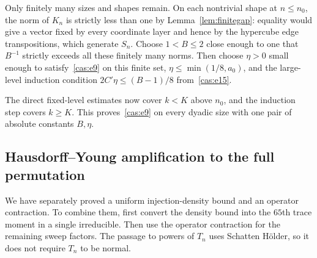 Only finitely many sizes and shapes remain. On each nontrivial shape
at $n\le n_0$, the norm of $K_n$ is strictly less than one by
Lemma~\ref{lem:finitegap}: equality would give a vector fixed by
every coordinate layer and hence by the hypercube edge transpositions,
which generate $S_n$. Choose $1<B\le2$ close enough to one that
$B^{-1}$ strictly exceeds all these finitely many norms. Then choose
$\eta>0$ small enough to satisfy~\eqref{cas:e9} on this finite set,
$\eta\le\min(1/8,a_0)$, and the large-level induction condition
$2C'\eta\le(B-1)/8$ from~\eqref{cas:e15}.

The direct fixed-level estimates now cover $k<K$ above $n_0$, and the
induction step covers $k\ge K$. This proves~\eqref{cas:e9} on every
dyadic size with one pair of absolute constants $B,\eta$.

\subsection{Hausdorff--Young amplification to the full permutation}

We have separately proved a uniform injection-density bound and an
operator contraction.  To combine them, first convert the density bound
into the $65$th trace moment in a single irreducible.  Then use the
operator contraction for the remaining sweep factors.  The passage to
powers of $T_n$ uses Schatten H\"older, so it does not require $T_n$ to be
normal.

